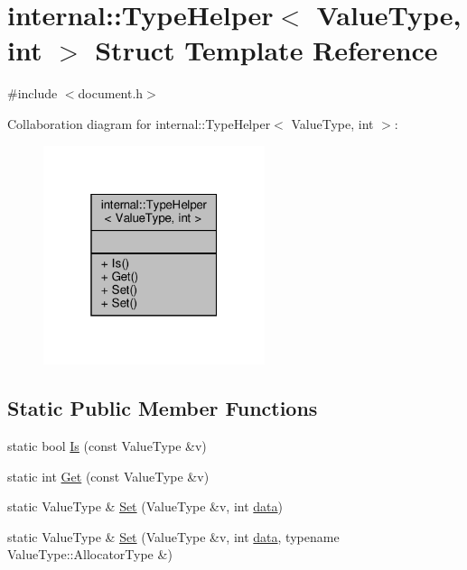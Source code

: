 \hypertarget{structinternal_1_1TypeHelper_3_01ValueType_00_01int_01_4}{}\section{internal\+:\+:Type\+Helper$<$ Value\+Type, int $>$ Struct Template Reference}
\label{structinternal_1_1TypeHelper_3_01ValueType_00_01int_01_4}


{\ttfamily \#include $<$document.\+h$>$}



Collaboration diagram for internal\+:\+:Type\+Helper$<$ Value\+Type, int $>$\+:
\nopagebreak
\begin{figure}[H]
\begin{center}
\leavevmode
\includegraphics[width=184pt]{structinternal_1_1TypeHelper_3_01ValueType_00_01int_01_4__coll__graph}
\end{center}
\end{figure}
\subsection*{Static Public Member Functions}
\begin{DoxyCompactItemize}
\item 
static bool \hyperlink{structinternal_1_1TypeHelper_3_01ValueType_00_01int_01_4_aa17ef940501aac12fd7934ef979c607e}{Is} (const Value\+Type \&v)
\item 
static int \hyperlink{structinternal_1_1TypeHelper_3_01ValueType_00_01int_01_4_a98c331ac026873b9ad4ba68e7bf28446}{Get} (const Value\+Type \&v)
\item 
static Value\+Type \& \hyperlink{structinternal_1_1TypeHelper_3_01ValueType_00_01int_01_4_aceea0a0fac6684e53a9d9f66da4154cd}{Set} (Value\+Type \&v, int \hyperlink{imgui__impl__opengl3__loader_8h_abd87654504355b4c1bb002dcb1d4d16a}{data})
\item 
static Value\+Type \& \hyperlink{structinternal_1_1TypeHelper_3_01ValueType_00_01int_01_4_a2ca21bedcaeaf0fffe913edb2fe1a66a}{Set} (Value\+Type \&v, int \hyperlink{imgui__impl__opengl3__loader_8h_abd87654504355b4c1bb002dcb1d4d16a}{data}, typename Value\+Type\+::\+Allocator\+Type \&)
\end{DoxyCompactItemize}


